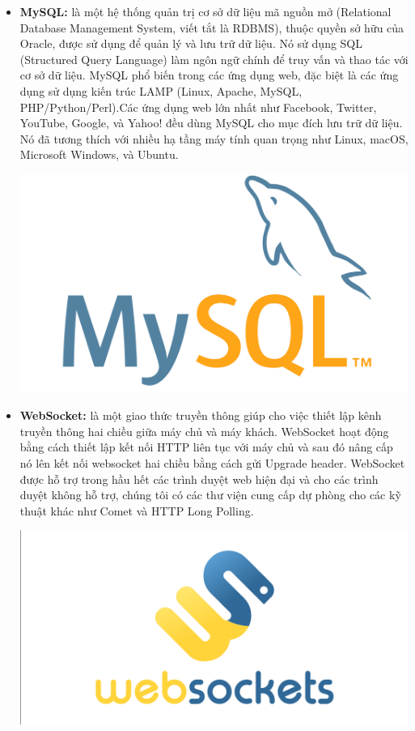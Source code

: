 \begin{itemize}
    \item \textbf{MySQL:} là một hệ thống quản trị cơ sở dữ liệu mã nguồn mở (Relational Database Management System, viết tắt là RDBMS), thuộc quyền sở hữu của Oracle, được sử dụng để quản lý và lưu trữ dữ liệu. Nó sử dụng SQL (Structured Query Language) làm ngôn ngữ chính để truy vấn và thao tác với cơ sở dữ liệu. MySQL phổ biến trong các ứng dụng web, đặc biệt là các ứng dụng sử dụng kiến trúc LAMP (Linux, Apache, MySQL, PHP/Python/Perl).Các ứng dụng web lớn nhất như Facebook, Twitter, YouTube, Google, và Yahoo! đều dùng MySQL cho mục đích lưu trữ dữ liệu. Nó đã tương thích với nhiều hạ tầng máy tính quan trọng như Linux, macOS, Microsoft Windows, và Ubuntu.
    
    \includegraphics[width=\textwidth]{imgs/mysql.png}
\end{itemize}

\begin{itemize}
    \item \textbf{WebSocket:} là một giao thức truyền thông giúp cho việc thiết lập kênh truyền thông hai chiều giữa máy chủ và máy khách. WebSocket hoạt động bằng cách thiết lập kết nối HTTP liên tục với máy chủ và sau đó nâng cấp nó lên kết nối websocket hai chiều bằng cách gửi Upgrade header. WebSocket được hỗ trợ trong hầu hết các trình duyệt web hiện đại và cho các trình duyệt không hỗ trợ, chúng tôi có các thư viện cung cấp dự phòng cho các kỹ thuật khác như Comet và HTTP Long Polling.
    
    \includegraphics[width=\textwidth]{imgs/websocket.png}
\end{itemize}





